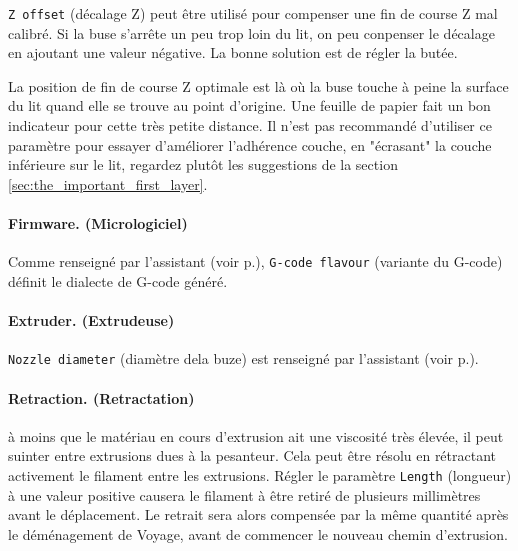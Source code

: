 \texttt{Z offset} (d\'ecalage Z) peut \^etre utilis\'e pour compenser une fin de course Z mal calibr\'e. Si la buse s'arr\^ete un peu trop loin du lit, on peu conpenser le d\'ecalage en ajoutant une valeur n\'egative. La bonne solution est de r\'egler la but\'ee.

La position de fin de course Z optimale est l\`a o\`u la buse touche \`a peine la surface du lit quand elle se trouve au point d'origine. Une feuille de papier fait un bon indicateur pour cette tr\`es petite distance. Il n'est pas recommand\'e d'utiliser ce param\`etre pour essayer d'am\'eliorer l'adh\'erence couche, en "\'ecrasant" la couche inf\'erieure sur le lit, regardez plut\^ot les suggestions de la section \ref{sec:the_important_first_layer}.

\paragraph{Firmware. (Micrologiciel)} %
\label{par:firmware}
Comme renseign\'e par l'assistant (voir p.\pageref{sub:1_firmware_type}), \texttt{G-code flavour} (variante du G-code) d\'efinit le dialecte de G-code g\'en\'er\'e.


\paragraph{Extruder. (Extrudeuse)} %
\label{par:extruder}
\texttt{Nozzle diameter} (diam\`etre dela buze) est renseign\'e par l'assistant (voir p.\pageref{sub:3_nozzle_diameter}).

\paragraph{Retraction. (Retractation)} %
\label{par:retraction}
\`a moins que le mat\'eriau en cours d'extrusion ait une viscosit\'e tr\`es \'elev\'ee, il peut suinter entre extrusions dues \`a la pesanteur. Cela peut \^etre r\'esolu en r\'etractant activement le filament entre les extrusions.  R\'egler le param\`etre \texttt{Length} (longueur) \`a une valeur positive causera le filament \`a \^etre retir\'e de plusieurs millim\`etres avant le d\'eplacement. Le retrait sera alors compens\'ee par la m\^eme quantit\'e apr\`es le d\'em\'enagement de Voyage, avant de commencer le nouveau chemin d'extrusion.

